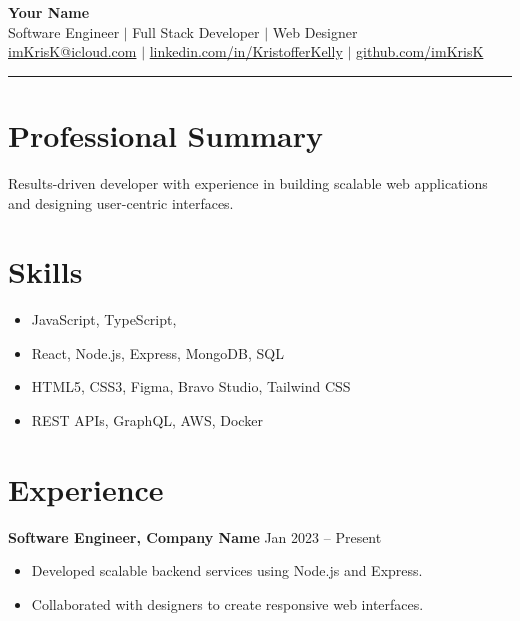 \documentclass[a4paper,10pt]{article}
\newcommand{\sectionline}{\noindent\color{primary}\rule{\linewidth}{1pt}}
\begin{document}

\begin{center}
    {\LARGE \textbf{Your Name}} \\[2pt]
    \textcolor{secondary}{Software Engineer $\vert$ Full Stack Developer $\vert$ Web Designer} \\[2pt]
    \href{mailto:imkrisk@icloud.com}{imKrisK@icloud.com} $\vert$ 
    \href{https://linkedin.com/in/KristofferKelly}{linkedin.com/in/KristofferKelly} $\vert$ 
    \href{https://github.com/imKrisK}{github.com/imKrisK}
\end{center}

\vspace{0.5em}
\sectionline

\section*{Professional Summary}
Results-driven developer with experience in building scalable web applications and designing user-centric interfaces.

\section*{Skills}
\begin{itemize}[leftmargin=*]
    \item JavaScript, TypeScript, 
    \item React, Node.js, Express, MongoDB, SQL
    \item HTML5, CSS3, Figma, Bravo Studio, Tailwind CSS
    \item REST APIs, GraphQL, AWS, Docker
\end{itemize}

\section*{Experience}
\textbf{Software Engineer, Company Name} \hfill Jan 2023 -- Present\\
\begin{itemize}[leftmargin=*]
    \item Developed scalable backend services using Node.js and Express.
    \item Collaborated with designers to create responsive web interfaces.
\end{itemize}
\end{document}
